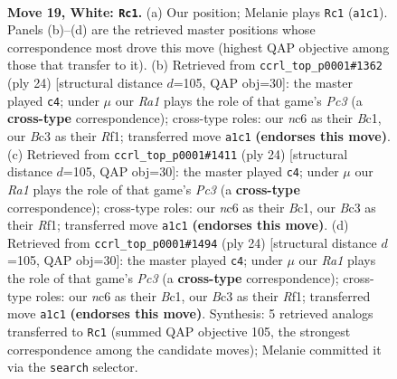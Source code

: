 \documentclass[11pt]{article}
\begin{document}
\clearpage

\begin{figure}[p]\centering
\begin{subfigure}{0.46\textwidth}\centering
\resizebox{\linewidth}{!}{%
\newchessgame
\chessboard[
  setfen={1rb2r2/p1ppqp2/2n1p2k/2n3pp/2Q5/2B2NP1/PP2PP1P/R3KB1R w - - 0 19},
  showmover=false,
  pgfstyle=straightmove, color=movearrow, markmove={a1-c1}
]}
\caption{}
\end{subfigure}\hfill
\begin{subfigure}{0.46\textwidth}\centering
\resizebox{\linewidth}{!}{%
\newchessgame
\chessboard[
  setfen={r1b2rk1/ppq2ppp/2n2n2/1Q2p3/8/P1P2NP1/4PPBP/R1B2RK1 w - - 2 13},
  showmover=false,
  pgfstyle=straightmove, color=movearrow, markmove={c3-c4}
]}
\caption{}
\end{subfigure}
\\[4pt]
\begin{subfigure}{0.46\textwidth}\centering
\resizebox{\linewidth}{!}{%
\newchessgame
\chessboard[
  setfen={r1b2rk1/ppq2ppp/2n2n2/1Q2p3/8/P1P2NP1/4PPBP/R1B2RK1 w - - 2 13},
  showmover=false,
  pgfstyle=straightmove, color=movearrow, markmove={c3-c4}
]}
\caption{}
\end{subfigure}\hfill
\begin{subfigure}{0.46\textwidth}\centering
\resizebox{\linewidth}{!}{%
\newchessgame
\chessboard[
  setfen={r1b2rk1/ppq2ppp/2n2n2/1Q2p3/8/P1P2NP1/4PPBP/R1B2RK1 w - - 2 13},
  showmover=false,
  pgfstyle=straightmove, color=movearrow, markmove={c3-c4}
]}
\caption{}
\end{subfigure}
\caption{\textbf{Move 19, White: \texttt{Rc1}.} (a) Our position; Melanie plays \texttt{Rc1} (\texttt{a1c1}). Panels (b)--(d) are the retrieved master positions whose correspondence most drove this move (highest QAP objective among those that transfer to it). (b) Retrieved from \texttt{ccrl\_top\_p0001\#1362} (ply 24) [structural distance $d$=105, QAP obj=30]: the master played \texttt{c4}; under $\mu$ our \emph{Ra1} plays the role of that game's \emph{Pc3} (a \textbf{cross-type} correspondence); cross-type roles: our \emph{n}c6 as their \emph{B}c1, our \emph{B}c3 as their \emph{R}f1; transferred move \texttt{a1c1} \textbf{(endorses this move)}. (c) Retrieved from \texttt{ccrl\_top\_p0001\#1411} (ply 24) [structural distance $d$=105, QAP obj=30]: the master played \texttt{c4}; under $\mu$ our \emph{Ra1} plays the role of that game's \emph{Pc3} (a \textbf{cross-type} correspondence); cross-type roles: our \emph{n}c6 as their \emph{B}c1, our \emph{B}c3 as their \emph{R}f1; transferred move \texttt{a1c1} \textbf{(endorses this move)}. (d) Retrieved from \texttt{ccrl\_top\_p0001\#1494} (ply 24) [structural distance $d$=105, QAP obj=30]: the master played \texttt{c4}; under $\mu$ our \emph{Ra1} plays the role of that game's \emph{Pc3} (a \textbf{cross-type} correspondence); cross-type roles: our \emph{n}c6 as their \emph{B}c1, our \emph{B}c3 as their \emph{R}f1; transferred move \texttt{a1c1} \textbf{(endorses this move)}. Synthesis: 5 retrieved analogs transferred to \texttt{Rc1} (summed QAP objective 105, the strongest correspondence among the candidate moves); Melanie committed it via the \texttt{search} selector.}
\label{fig:thought-m36}
\end{figure}
\end{document}
